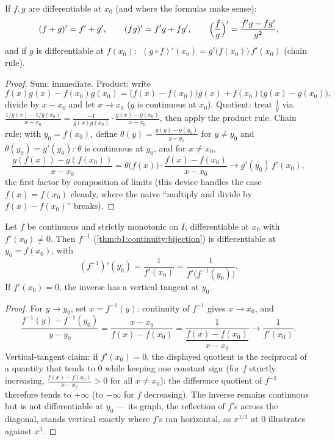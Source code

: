 \begin{theorem}[Operations]\label{thm:b1:derivative:operations}
If $f, g$ are differentiable at $x_0$ (and where the formulas make
sense):
\[
(f + g)' = f' + g', \qquad
(fg)' = f'g + fg', \qquad
\Bigl(\frac fg\Bigr)' = \frac{f'g - fg'}{g^2},
\]
and if $g$ is differentiable at $f(x_0)$:
$\;(g \circ f)'(x_0) = g'\bigl(f(x_0)\bigr)\, f'(x_0)$ (chain
rule).
\end{theorem}

\begin{proof}
Sum: immediate. Product: write
\[
f(x)g(x) - f(x_0)g(x_0)
= \bigl(f(x) - f(x_0)\bigr) g(x) + f(x_0)\bigl(g(x) - g(x_0)\bigr),
\]
divide by $x - x_0$ and let $x \to x_0$ ($g$ is continuous at $x_0$).
Quotient: treat $\frac 1g$ via $\frac{1/g(x) - 1/g(x_0)}{x - x_0} =
\frac{-1}{g(x)g(x_0)}\cdot\frac{g(x) - g(x_0)}{x - x_0}$, then apply
the product rule. Chain rule: with $y_0 = f(x_0)$, define
$\theta(y) = \frac{g(y) - g(y_0)}{y - y_0}$ for $y \neq y_0$ and
$\theta(y_0) = g'(y_0)$: $\theta$ is continuous at $y_0$, and for
$x \neq x_0$,
\[
\frac{g(f(x)) - g(f(x_0))}{x - x_0}
= \theta\bigl(f(x)\bigr)\cdot \frac{f(x) - f(x_0)}{x - x_0}
\longrightarrow g'(y_0)\, f'(x_0),
\]
the first factor by composition of limits (this device handles the
case $f(x) = f(x_0)$ cleanly, where the naive ``multiply and divide
by $f(x) - f(x_0)$'' breaks).
\end{proof}

\begin{theorem}\label{thm:b1:derivative:inverse}
Let $f$ be continuous and strictly monotonic on $I$, differentiable
at $x_0$ with $f'(x_0) \neq 0$. Then $f^{-1}$
(\cref{thm:b1:continuity:bijection}) is differentiable at $y_0 =
f(x_0)$, with
\[
(f^{-1})'(y_0) = \frac{1}{f'(x_0)} = \frac{1}{f'\bigl(f^{-1}(y_0)\bigr)} .
\]
If $f'(x_0) = 0$, the inverse has a vertical tangent at $y_0$.
\end{theorem}

\begin{proof}
For $y \to y_0$, set $x = f^{-1}(y)$: continuity of $f^{-1}$ gives $x
\to x_0$, and
\[
\frac{f^{-1}(y) - f^{-1}(y_0)}{y - y_0}
= \frac{x - x_0}{f(x) - f(x_0)}
= \frac{1}{\dfrac{f(x) - f(x_0)}{x - x_0}}
\longrightarrow \frac{1}{f'(x_0)} .
\]
Vertical-tangent claim: if $f'(x_0) = 0$, the displayed quotient
is the reciprocal of a quantity that tends to $0$ while keeping
one constant sign (for $f$ strictly increasing, $\frac{f(x) -
f(x_0)}{x - x_0} > 0$ for all $x \neq x_0$): the difference
quotient of $f^{-1}$ therefore tends to $+\infty$ (to $-\infty$
for $f$ decreasing). The inverse remains continuous but is not
differentiable at $y_0$ --- its graph, the reflection of $f$'s
across the diagonal, stands vertical exactly where $f$'s ran
horizontal, as $x^{1/3}$ at $0$ illustrates against $x^3$.
\end{proof}

